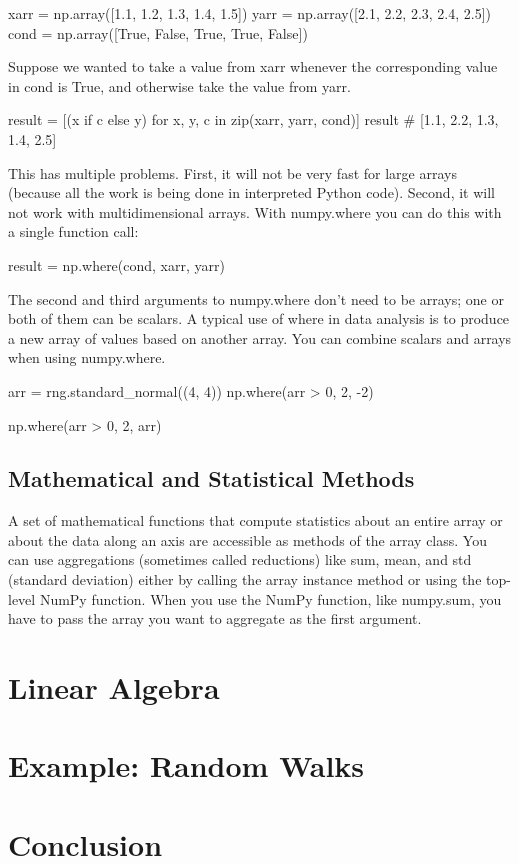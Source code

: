 \begin{pyc}
xarr = np.array([1.1, 1.2, 1.3, 1.4, 1.5])
yarr = np.array([2.1, 2.2, 2.3, 2.4, 2.5])
cond = np.array([True, False, True, True, False])
\end{pyc}
Suppose we wanted to take a value from xarr whenever the corresponding value in cond is True, and otherwise take the value from yarr.
\begin{pyc}
result = [(x if c else y) for x, y, c in zip(xarr, yarr, cond)]
result
# [1.1, 2.2, 1.3, 1.4, 2.5]
\end{pyc}

This has multiple problems. First, it will not be very fast for large arrays (because all the work is being done in interpreted Python code). Second, it will not work with multidimensional arrays. With numpy.where you can do this with a single function call:
\begin{pyc}
result = np.where(cond, xarr, yarr)
\end{pyc}

The second and third arguments to numpy.where don’t need to be arrays; one or both of them can be scalars. A typical use of where in data analysis is to produce a new array of values based on another array. You can combine scalars and arrays when using numpy.where. 
\begin{pyc}
arr = rng.standard_normal((4, 4))
np.where(arr > 0, 2, -2)

np.where(arr > 0, 2, arr)
\end{pyc}

\subsection{Mathematical and Statistical Methods}
A set of mathematical functions that compute statistics about an entire array or about the data along an axis are accessible as methods of the array class. You can use aggregations (sometimes called reductions) like sum, mean, and std (standard deviation) either by calling the array instance method or using the top-level NumPy function. When you use the NumPy function, like numpy.sum, you have to pass the array you want to aggregate as the first argument.
\section{Linear Algebra}
\section{Example: Random Walks}
\section{Conclusion}